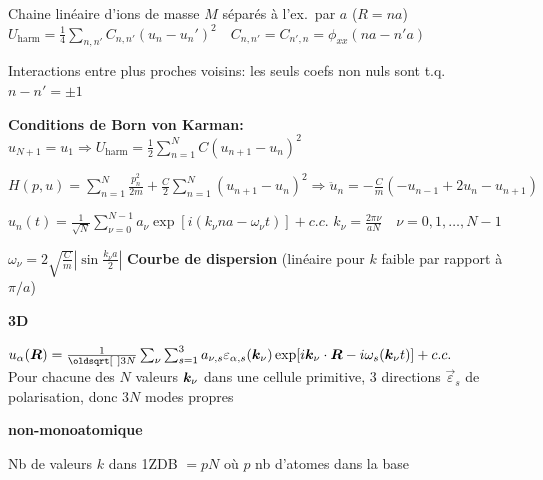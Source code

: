 \begin{squishlist}
    \item Chaine linéaire d'ions de masse $M$ séparés à l'ex.\ par $a$ ($R = na$)\\
    $U_{\text{harm}} = \frac{1}{4} \sum_{n,n'} C_{n,n'}(u_n - u_n')^2 \quad C_{n,n'} = C_{n',n} = \phi_{xx}(na - n'a)$
    \item Interactions entre plus proches voisins: les seuls coefs non nuls sont t.q.\ $n-n'= \pm 1$
    \item \textbf{Conditions de Born von Karman:} $u_{N+1} = u_1 \Longrightarrow U_{\text{harm}} = \frac{1}{2}\sum_{n=1}^{N}C(u_{n+1}-u_n)^2$
    \item $H(p,u) = \sum_{n=1}^{N}\frac{p^2_n}{2m} + \frac{C}{2}\sum_{n=1}^{N}(u_{n+1} - u_n)^2 \Longrightarrow \ddot{u}_n = -\frac{C}{m}(-u_{n-1}+2u_n - u_{n+1})$
    \item $u_n(t) = \frac{1}{\sqrt{N}} \sum_{\nu=0}^{N-1}a_{\nu} \exp[ i (k_{\nu}na - \omega_{\nu}t)] + c.c.$ \quad $k_{\nu} = \frac{2\pi \nu}{aN} \quad \nu = 0,1,\ldots, N-1$ 
    \item $\omega_{\nu} = 2 \sqrt{\frac{C}{m}} \left| \sin \frac{k_{\nu}a}{2}\right|$ \textbf{Courbe de dispersion} (linéaire pour $k$ faible par rapport à $\pi/a$)

    \squishline

    \textbf{3D}
    \item $u_{\alpha}(\vR) = \frac{1}{\sqrt{3N}}\sum_{\nu}\sum_{s=1}^{3} a_{\nu,s} \varepsilon_{\alpha,s}(\vk_{\nu}) \exp [i \vk_{\nu} \cdot \vR - i \omega_s(\vk_{\nu}t)] + c.c.$ \\ 
    Pour chacune des $N$ valeurs $\bm{k}_{\nu}$ dans une cellule primitive, 3 directions $\vec{\varepsilon}_s$ de polarisation, donc $3N$ modes propres

    \squishline

    \textbf{non-monoatomique}
    \item Nb de valeurs $k$ dans 1ZDB $= pN$ où $p$ nb d'atomes dans la base

\end{squishlist}

